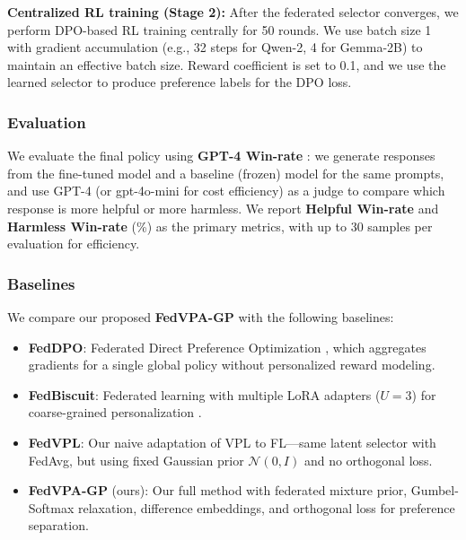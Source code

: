 \textbf{Centralized RL training (Stage 2):} After the federated selector converges, we perform DPO-based RL training centrally for 50 rounds. We use batch size 1 with gradient accumulation (e.g., 32 steps for Qwen-2, 4 for Gemma-2B) to maintain an effective batch size. Reward coefficient is set to 0.1, and we use the learned selector to produce preference labels for the DPO loss.

\subsubsection{Evaluation}
We evaluate the final policy using \textbf{GPT-4 Win-rate} \citep{bai2022training}: we generate responses from the fine-tuned model and a baseline (frozen) model for the same prompts, and use GPT-4 (or gpt-4o-mini for cost efficiency) as a judge to compare which response is more helpful or more harmless. We report \textbf{Helpful Win-rate} and \textbf{Harmless Win-rate} (\%) as the primary metrics, with up to 30 samples per evaluation for efficiency.

\subsubsection{Baselines}
We compare our proposed \textbf{FedVPA-GP} with the following baselines:
\begin{itemize}
    \item \textbf{FedDPO}: Federated Direct Preference Optimization \citep{ye2024openfedllm}, which aggregates gradients for a single global policy without personalized reward modeling.
    \item \textbf{FedBiscuit}: Federated learning with multiple LoRA adapters ($U=3$) for coarse-grained personalization \citep{wu2024towards}.
    \item \textbf{FedVPL}: Our naive adaptation of VPL \citep{poddar2024personalizing} to FL—same latent selector with FedAvg, but using fixed Gaussian prior $\mathcal{N}(0, I)$ and no orthogonal loss.
    \item \textbf{FedVPA-GP} (ours): Our full method with federated mixture prior, Gumbel-Softmax relaxation, difference embeddings, and orthogonal loss for preference separation.
\end{itemize}
